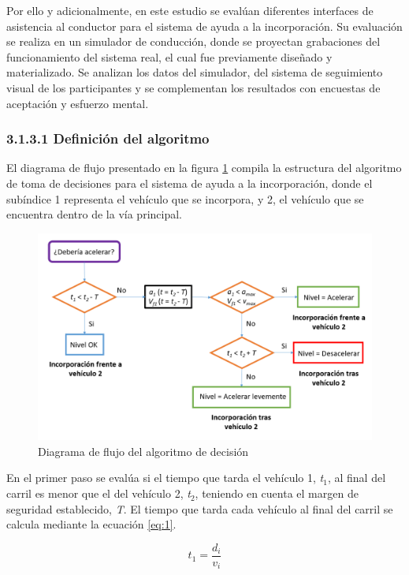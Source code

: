 Por ello y adicionalmente, en este estudio se evalúan diferentes interfaces de asistencia al conductor para el sistema de ayuda a la incorporación. Su evaluación se realiza en un simulador de conducción, donde se proyectan grabaciones del funcionamiento del sistema real, el cual fue previamente diseñado y materializado. Se analizan los datos del simulador, del sistema de seguimiento visual de los participantes y se complementan los resultados con encuestas de aceptación y esfuerzo mental.

\subsubsection{3.1.3.1	Definición del algoritmo }\label{3131}

El diagrama de flujo presentado en la figura \ref{fig:3.7} compila la estructura del algoritmo de toma de decisiones para el sistema de ayuda a la incorporación, donde el subíndice 1 representa el vehículo que se incorpora, y 2, el vehículo que se encuentra dentro de la vía principal. 

\begin{figure}[h]
    \centering
    \includegraphics[width=12.5cm]
    {figures/3.7.png}
    \caption{ \label{fig:3.7} Diagrama de flujo del algoritmo de decisión}
\end{figure}

En el primer paso se evalúa si el tiempo que tarda el vehículo 1, \emph{t$_1$}, al final del carril es menor que el del vehículo 2, \emph{t$_2$}, teniendo en cuenta el margen de seguridad establecido, \emph{T}. El tiempo que tarda cada vehículo al final del carril se calcula mediante la ecuación \ref{eq:1}.

\begin{equation}\label{eq:1}
t_1 = \frac{d_i}{v_i}
\end{equation}

